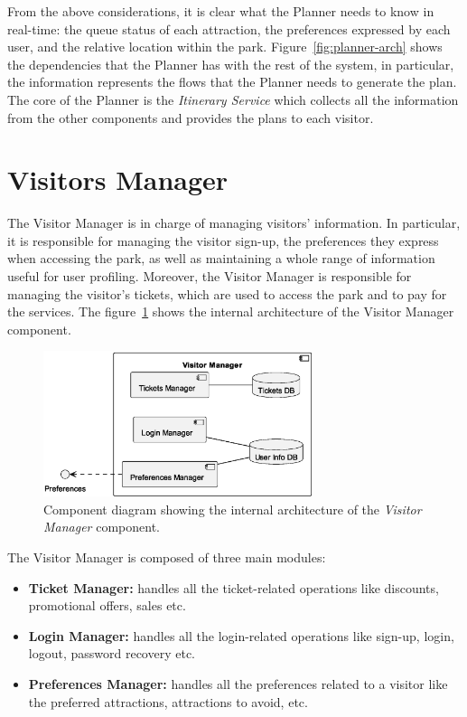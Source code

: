 From the above considerations, it is clear what the Planner needs to know in real-time: the queue status of each attraction, the preferences expressed
by each user, and the relative location within the park. Figure~\ref{fig:planner-arch} shows the dependencies that the Planner has with the rest of
the system, in particular, the information represents the flows that the Planner needs to generate the plan. The core of the Planner is
the \textit{Itinerary Service} which collects all the information from the other components and provides the plans to each visitor.

\newpage

\section{Visitors Manager}

The Visitor Manager is in charge of managing visitors' information. In particular, it is responsible for managing the visitor sign-up, the
preferences they express when accessing the park, as well as maintaining a whole range of information useful for user profiling. Moreover, the
Visitor Manager is responsible for managing the visitor's tickets, which are used to access the park and to pay for the services.
The figure~\ref{fig:visitor-manager-arch} shows the internal architecture of the Visitor Manager component.

\begin{figure}[H]
	\centering
	\includegraphics[width=0.7\textwidth]{img/visitor-manager.eps}
	\caption{Component diagram showing the internal architecture of the \textit{Visitor Manager} component.
	}
	\label{fig:visitor-manager-arch}
\end{figure}
The Visitor Manager is composed of three main modules:

\begin{itemize}
	\item \textbf{Ticket Manager:} handles all the ticket-related operations like discounts, promotional offers, sales etc.
	\item \textbf{Login Manager:} handles all the login-related operations like sign-up, login, logout, password recovery etc.
	\item \textbf{Preferences Manager:} handles all the preferences related to a visitor like the preferred attractions, attractions to avoid, etc.
\end{itemize}

